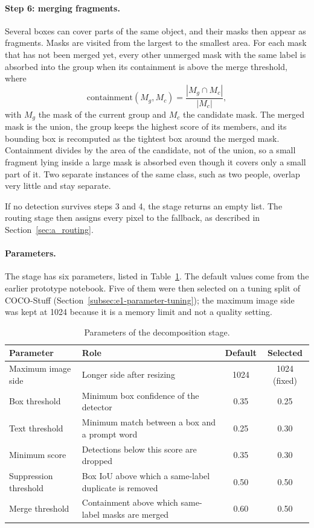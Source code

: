 \documentclass{FastFyp}
\begin{document}
\paragraph{Step 6: merging fragments.} Several boxes can cover parts of the same object, and their masks then appear as fragments. Masks are visited from the largest to the smallest area. For each mask that has not been merged yet, every other unmerged mask with the same label is absorbed into the group when its containment is above the merge threshold, where
\begin{equation}
\mathrm{containment}(M_g, M_c)=\frac{|M_g\cap M_c|}{|M_c|},
\end{equation}
with $M_g$ the mask of the current group and $M_c$ the candidate mask. The merged mask is the union, the group keeps the highest score of its members, and its bounding box is recomputed as the tightest box around the merged mask. Containment divides by the area of the candidate, not of the union, so a small fragment lying inside a large mask is absorbed even though it covers only a small part of it. Two separate instances of the same class, such as two people, overlap very little and stay separate.
 
If no detection survives steps 3 and 4, the stage returns an empty list. The routing stage then assigns every pixel to the fallback, as described in Section~\ref{sec:a_routing}.
 
\paragraph{Parameters.} The stage has six parameters, listed in Table~\ref{tab:a_params}. The default values come from the earlier prototype notebook. Five of them were then selected on a tuning split of COCO-Stuff (Section~\ref{subsec:e1-parameter-tuning}); the maximum image side was kept at 1024 because it is a memory limit and not a quality setting.

\begin{table}[!ht]
\centering
\caption{Parameters of the decomposition stage.}
\label{tab:a_params}
\begin{tabular}{|p{3cm}|p{4.8cm}|c|c|}
\hline
\textbf{Parameter} & \textbf{Role} & \textbf{Default} & \textbf{Selected} \\ \hline
Maximum image side & Longer side after resizing & 1024 & 1024 (fixed) \\ \hline
Box threshold & Minimum box confidence of the detector & 0.35 & 0.25 \\ \hline
Text threshold & Minimum match between a box and a prompt word & 0.25 & 0.30 \\ \hline
Minimum score & Detections below this score are dropped & 0.35 & 0.30 \\ \hline
Suppression threshold & Box IoU above which a same-label duplicate is removed & 0.50 & 0.50 \\ \hline
Merge threshold & Containment above which same-label masks are merged & 0.60 & 0.50 \\ \hline
\end{tabular}
\end{table}
\end{document}
